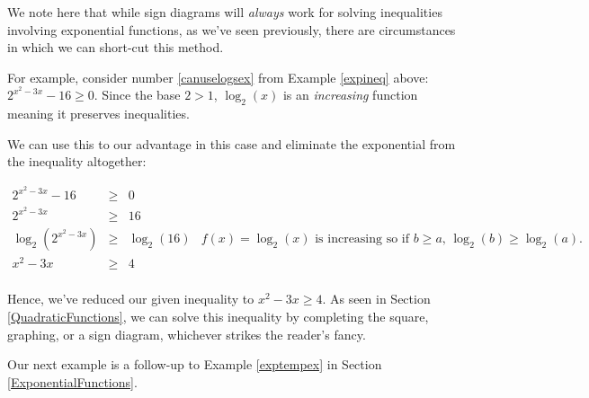 \documentclass{ximera}
\begin{document}
We note here that while sign diagrams will \textit{always} work for solving inequalities involving exponential functions, as we've seen previously, there are circumstances in which we can short-cut this method. 



For example, consider number \ref{canuselogsex} from Example \ref{expineq} above:  $2^{x^2-3x} - 16 \geq 0$.  Since the base $2>1$, $\log_{2}(x)$ is an \textit{increasing} function meaning it preserves inequalities.



We can use this to our advantage in this case and eliminate the exponential from the inequality altogether:

\[ \begin{array}{rclr}

2^{x^2-3x} - 16 &  \geq &  0 &  \\

2^{x^2-3x}  & \geq & 16 & \\

\log_{2}\left(2^{x^2-3x} \right) & \geq & \log_{2}(16) & \text{$f(x) = \log_{2}(x)$ is increasing so if $b \geq a$, $\log_{2}(b) \geq \log_{2}(a)$. } \\

x^2 - 3x & \geq & 4 &\\ \end{array} \]

Hence, we've  reduced our given inequality to $x^2-3x \geq 4$.  As seen in Section \ref{QuadraticFunctions}, we can solve this inequality by completing the square, graphing, or a sign diagram, whichever strikes the reader's fancy.

Our next example is a follow-up to Example \ref{exptempex} in Section \ref{ExponentialFunctions}.  
\end{document}
